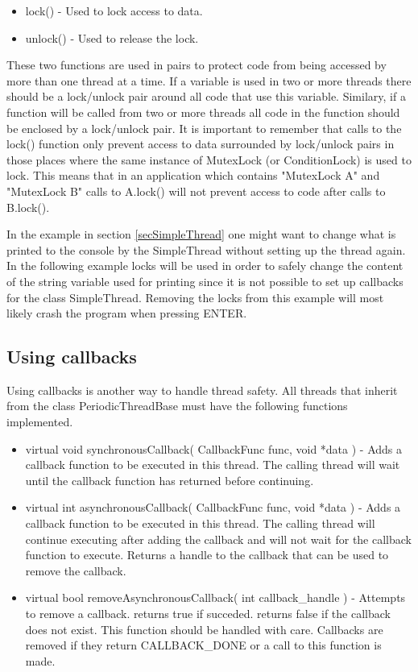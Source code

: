 \begin{itemize}
\item lock() - Used to lock access to data.
\item unlock() - Used to release the lock.
\end{itemize}

These two functions are used in pairs to protect code from being accessed by
more than one thread at a time. If a variable is used in two or more threads
there should be a lock/unlock pair around all code that use this variable. Similary, if a
function will be called from two or more threads all code in the function should
be enclosed by a lock/unlock pair. It is important to remember that calls to
the lock() function only prevent access to data surrounded by lock/unlock pairs
in those places where the same instance of MutexLock (or ConditionLock) is used
to lock. This means that in an application which contains "MutexLock A" and
"MutexLock B" calls to A.lock() will not prevent access to code after calls to
B.lock().

In the example in section \ref{secSimpleThread} one might want to change what
is printed to the console by the SimpleThread without setting up the thread
again. In the following example locks will be used in order to safely change
the content of the string variable used for printing since it is not possible
to set up callbacks for the class SimpleThread. Removing the locks from this
example will most likely crash the program when pressing ENTER.



\subsection{Using callbacks}
Using callbacks is another way to handle thread safety. All threads that
inherit from the class PeriodicThreadBase must have the following functions
implemented.

\begin{itemize}
\item virtual void synchronousCallback( CallbackFunc func, void *data ) - Adds
  a callback function to be executed in this thread. The calling thread will
  wait until the callback function has returned before continuing.
\item virtual int asynchronousCallback( CallbackFunc func, void *data ) - Adds
  a callback function to be executed in this thread. The calling thread will
  continue executing after adding the callback and will not wait for the
  callback function to execute. Returns a handle to the callback that can be
  used to remove the callback.
\item virtual bool removeAsynchronousCallback( int callback\_handle ) - 
  Attempts to remove a callback. returns true if succeded. returns false if
  the callback does not exist. This function should be handled with care.
  Callbacks are removed if they return CALLBACK\_DONE or a call to this
  function is made.
\end{itemize}

